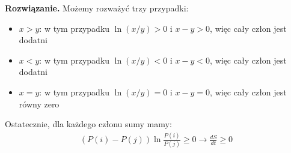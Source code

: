 \documentclass[11pt,a4paper]{article}
\newenvironment{solution}{\vspace{1cm} \par\textbf{Rozwiązanie.} \vspace{1cm}}{}
\begin{document}
\begin{solution}
Możemy rozważyć trzy przypadki:
\begin{itemize}
  \item $x > y$: w tym przypadku $\ln(x/y) > 0$ i $x-y > 0$, więc cały człon jest dodatni
  \item $x < y$: w tym przypadku $\ln(x/y) < 0$ i $x-y < 0$, więc cały człon jest dodatni
  \item $x = y$: w tym przypadku $\ln(x/y) = 0$ i $x-y = 0$, więc cały człon jest równy zero
\end{itemize}

Ostatecznie, dla każdego członu sumy mamy:
\begin{align*}
  (P(i) - P(j)) \ln \frac{P(i)}{P(j)} \geq 0 \rightarrow \frac{dS}{dt} \geq 0
\end{align*}

\newpage
\end{solution}
\end{document}
